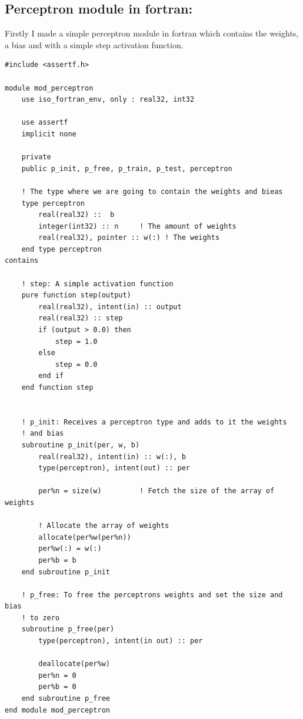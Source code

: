 \documentclass[12pt]{article}
\begin{document}
\subsection{Perceptron module in fortran:}
Firstly I made a simple perceptron module in fortran which contains the weights, a bias and with a
simple step activation function.
\begin{lstlisting}
#include <assertf.h>

module mod_perceptron
    use iso_fortran_env, only : real32, int32
 
    use assertf
    implicit none

    private
    public p_init, p_free, p_train, p_test, perceptron

    ! The type where we are going to contain the weights and bieas
    type perceptron
        real(real32) ::  b
        integer(int32) :: n     ! The amount of weights
        real(real32), pointer :: w(:) ! The weights
    end type perceptron
contains
    
    ! step: A simple activation function
    pure function step(output)
        real(real32), intent(in) :: output
        real(real32) :: step
        if (output > 0.0) then
            step = 1.0
        else
            step = 0.0
        end if
    end function step

    
    ! p_init: Receives a perceptron type and adds to it the weights
    ! and bias
    subroutine p_init(per, w, b)
        real(real32), intent(in) :: w(:), b
        type(perceptron), intent(out) :: per

        per%n = size(w)         ! Fetch the size of the array of weights
        
        ! Allocate the array of weights
        allocate(per%w(per%n))
        per%w(:) = w(:)
        per%b = b
    end subroutine p_init

    ! p_free: To free the perceptrons weights and set the size and bias
    ! to zero
    subroutine p_free(per)
        type(perceptron), intent(in out) :: per
        
        deallocate(per%w)
        per%n = 0
        per%b = 0
    end subroutine p_free
end module mod_perceptron
\end{lstlisting}
\end{document}
